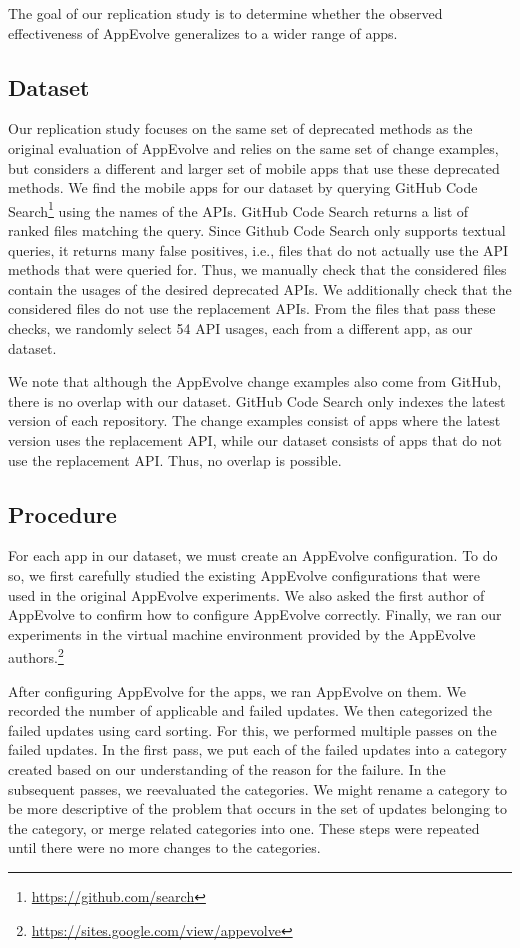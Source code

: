 The goal of our replication study is to determine whether the observed
effectiveness of AppEvolve generalizes to a wider range of apps.

\subsection{Dataset}
Our replication study focuses on the same set of deprecated methods as the
original evaluation of AppEvolve and relies on the same set of change
examples, but considers a different and larger set of mobile apps that use
these deprecated methods.  We find the mobile apps for our dataset by
querying GitHub Code Search\footnote{\url{https://github.com/search}} using
the names of the APIs. GitHub Code Search returns a list of ranked files
matching the query. Since Github Code Search only supports textual queries,
it returns many false positives, i.e., files that do not actually use the
API methods that were queried for.  Thus, we manually check that the
considered files contain the usages of the desired deprecated APIs.  We
additionally check that the considered files do not use the replacement
APIs. From the files that pass these checks, we randomly select 54 API
usages, each from a different app, as our dataset.

We note that although the AppEvolve change examples also come from GitHub,
there is no overlap with our dataset.  GitHub Code Search only indexes the
latest version of each repository.  The change examples consist of apps
where the latest version uses the replacement API, while our dataset
consists of apps that do not use the replacement API.  Thus, no overlap is
possible.

\subsection{Procedure}
For each app in our dataset, we must create an AppEvolve configuration. To
do so, we first carefully studied the existing AppEvolve configurations
that were used in the original AppEvolve experiments. We also asked the
first author of AppEvolve to confirm how to configure AppEvolve
correctly. Finally, we ran our experiments in the virtual machine
environment provided by the AppEvolve
authors.\footnote{\url{https://sites.google.com/view/appevolve}}

After configuring AppEvolve for the apps, we ran AppEvolve on them. We
recorded the number of applicable and failed updates. We then categorized
the failed updates using card sorting\cite{spencer09}. For this, we performed
multiple passes on the failed updates. In the first pass, we put each
of the failed updates into a category created based on our understanding of
the reason for the failure. In the subsequent passes, we reevaluated the
categories. We might rename a category to be more descriptive of the
problem that occurs in the set of updates belonging to the category, or
merge related categories into one. These steps were repeated until there
were no more changes to the categories.
